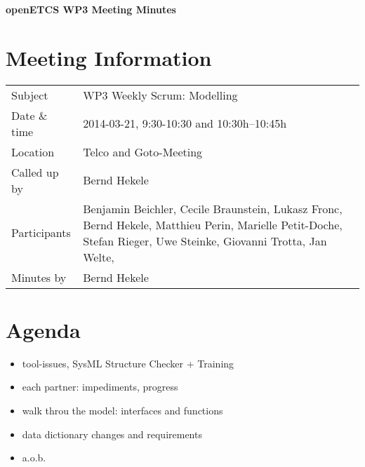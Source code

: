 \documentclass[a4paper, 11pt]{article}
\begin{document}
{\begin{center}\huge\bf openETCS WP3 Meeting Minutes\end{center}}
\section{Meeting Information}

\renewcommand{\arraystretch}{1.5}
\begin{supertabular}{m{.2\textwidth}m{.8\textwidth}}
Subject & WP3 Weekly Scrum: Modelling\\
Date \& time & 2014-03-21, 9:30-10:30 and 10:30h--10:45h\\
Location & Telco and Goto-Meeting\\
Called up by & Bernd Hekele\\
Participants &
Benjamin Beichler,
Cecile Braunstein,
Lukasz Fronc,
Bernd Hekele,
Matthieu Perin,
Marielle Petit-Doche,
Stefan Rieger,
Uwe Steinke,
Giovanni Trotta,
Jan Welte,
\\

Minutes by & Bernd Hekele\\
\end{supertabular}
\renewcommand{\arraystretch}{1.0}


\section{{Agenda}}
\begin{itemize}
\item tool-issues, SysML Structure Checker + Training
\item each partner: impediments, progress
\item walk throu the model: interfaces and functions
\item data dictionary changes and requirements
\item a.o.b.

\end{itemize}
\end{document}

